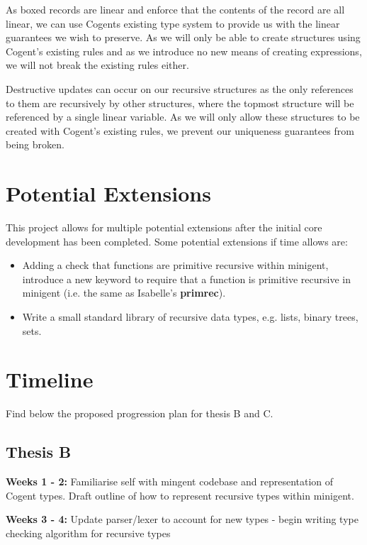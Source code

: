 As boxed records are linear and enforce that the contents of the record are all linear, we
can use Cogents existing type system to provide us with the linear guarantees we wish to preserve.
As we will only be able to create structures using Cogent's existing rules and as we introduce
no new means of creating expressions, we will not break the existing rules either. 

Destructive updates can occur on our recursive structures as the only references to them are
recursively by other structures, where the topmost structure will be referenced by a single linear
variable. As we will only allow these structures to be created with Cogent's existing rules,
we prevent our uniqueness guarantees from being broken.

\section{Potential Extensions}

This project allows for multiple potential extensions after the initial core development has been completed.
Some potential extensions if time allows are:

\begin{itemize}
    \item Adding a check that functions are primitive recursive within minigent, introduce a new keyword
          to require that a function is primitive recursive in minigent (i.e. the same as
          Isabelle's \textbf{primrec}).
    \item Write a small standard library of recursive data types, e.g. lists, binary trees, 
          sets.
\end{itemize}

\section{Timeline}

Find below the proposed progression plan for thesis B and C.

\subsection{Thesis B}

\textbf{Weeks 1 - 2:} Familiarise self with mingent codebase and representation of Cogent types. Draft outline
of how to represent recursive types within minigent.

\textbf{Weeks 3 - 4:} Update parser/lexer to account for new types - begin writing type checking algorithm for
recursive types

